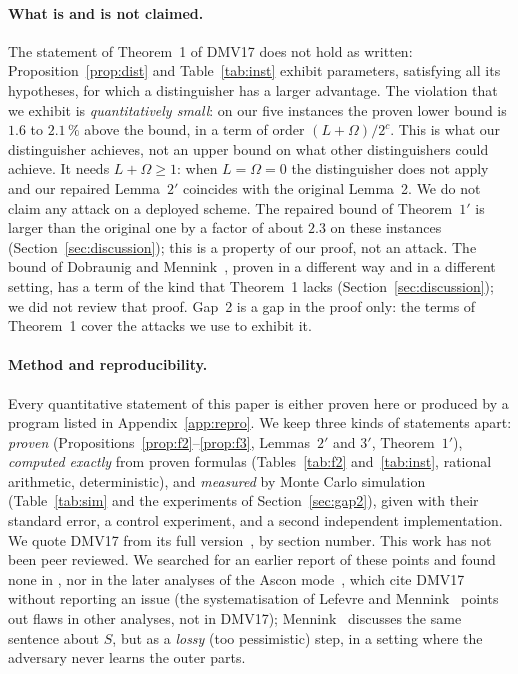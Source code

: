 \documentclass[11pt,a4paper]{article}
\theoremstyle{definition}
\theoremstyle{remark}
\begin{document}
\paragraph{What is and is not claimed.}
The statement of Theorem~1 of DMV17 does not hold as written: Proposition~\ref{prop:dist} and Table~\ref{tab:inst}
exhibit parameters, satisfying all its hypotheses, for which a distinguisher has a larger advantage. The violation
that we exhibit is \emph{quantitatively small}: on our five instances the proven lower bound is $1.6$ to $2.1\,\%$
above the bound, in a term of order $(L+\Omega)/2^c$. This is what our distinguisher achieves, not an upper bound on
what other distinguishers could achieve. It needs $L + \Omega \ge 1$: when $L = \Omega = 0$ the distinguisher does not
apply and our repaired Lemma~$2'$ coincides with the original Lemma~2. We do not claim any attack on a deployed
scheme. The repaired bound of Theorem~$1'$ is larger than the original one by a factor of about $2.3$ on these
instances (Section~\ref{sec:discussion}); this is a property of our proof, not an attack. The bound of
Dobraunig and Mennink~\cite{DM19}, proven in a different way and in a different setting, has a term of the kind that
Theorem~1 lacks (Section~\ref{sec:discussion}); we did not review that proof. Gap~2 is a gap in the proof only: the
terms of Theorem~1 cover the attacks we use to exhibit it.

\paragraph{Method and reproducibility.}
Every quantitative statement of this paper is either proven here or produced by a program listed in
Appendix~\ref{app:repro}. We keep three kinds of statements apart: \emph{proven} (Propositions~\ref{prop:f2}--\ref{prop:f3},
Lemmas~$2'$ and $3'$, Theorem~$1'$), \emph{computed exactly} from proven formulas (Tables~\ref{tab:f2} and~\ref{tab:inst},
rational arithmetic, deterministic), and \emph{measured} by Monte Carlo simulation (Table~\ref{tab:sim} and the experiments
of Section~\ref{sec:gap2}), given with their standard error, a control experiment, and a second independent
implementation. We quote DMV17 from its full version~\cite{DMV17}, by section number.
This work has not been peer reviewed. We searched for an earlier report of these points and found none in
\cite{DMV17,DM19,Men23}, nor in the later analyses of the Ascon mode~\cite{CDN23,CDN24,LM24,LM25}, which cite DMV17
without reporting an issue (the systematisation of Lefevre and Mennink~\cite{LM25} points out flaws in other analyses,
not in DMV17); Mennink~\cite[Section~8.3]{Men23} discusses the same sentence about $S$, but as a
\emph{lossy} (too pessimistic) step, in a setting where the adversary never learns the outer parts.
\end{document}
